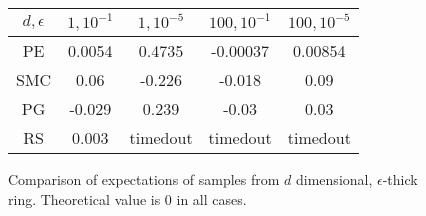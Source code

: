 \begin{figure}
\begin{center}
	\begin{tabular}{||c| c c c c||} 
	\hline
	 $d,\epsilon$& $1, {10^{-1}}$ & $1, {10^{-5}}$ & ${100}, {10^{-1}}$ & ${100}, {10^{-5}}$ \\ [0.5ex] 
	\hline\hline
	PE & 0.0054 & 0.4735  & -0.00037 & 0.00854\\ 
	\hline
	SMC & 0.06 & -0.226  & -0.018 & 0.09\\ 
	\hline
	PG & -0.029 & 0.239 & -0.03 & 0.03\\
	\hline
	RS & 0.003 & timedout & timedout & timedout \\
	\hline
 \end{tabular}
 \caption{Comparison of expectations of samples from $d$ dimensional, $\epsilon$-thick ring.  Theoretical value is 0 in all cases.}
 \label{results}
\end{center}
\vspace{-2em}
\end{figure}

  